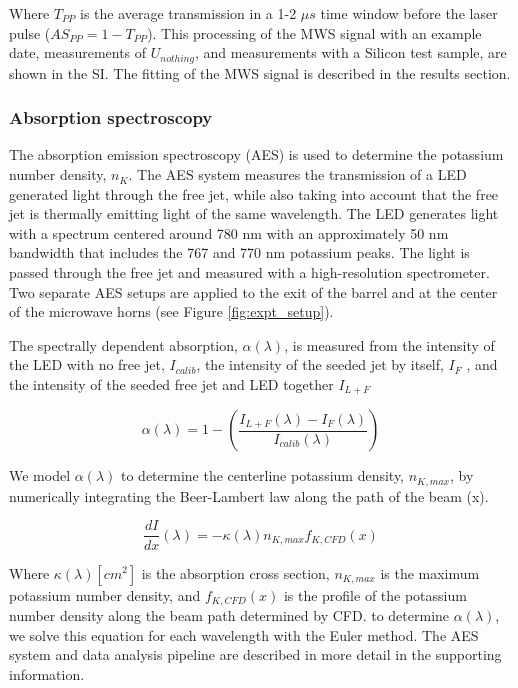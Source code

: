 Where $T_{PP}$ is the average transmission in a 1-2 $\mu s$ time window before the laser pulse ($AS_{PP} = 1 - T_{PP}$). This processing of the MWS signal with an example date, measurements of $U_{nothing}$, and measurements with a Silicon test sample, are shown in the SI. The fitting of the MWS signal is described in the results section. 


\subsubsection{Absorption spectroscopy}

The absorption emission spectroscopy (AES) is used to determine the potassium number density, $n_K$. The AES system measures the transmission of a LED generated light through the free jet, while also taking into account that the free jet is thermally emitting light of the same wavelength. The LED generates light with a spectrum centered around 780 nm with an approximately 50 nm bandwidth that includes the 767 and 770 nm potassium peaks. The light is passed through the free jet and measured with a high-resolution spectrometer. Two separate AES setups are applied to the exit of the barrel and at the center of the microwave horns (see Figure \ref{fig:expt_setup}).

The spectrally dependent absorption, $\alpha(\lambda)$, is measured from the intensity of the LED with no free jet, $I_{calib}$, the intensity of the seeded jet by itself, $I_F$ , and the intensity of the seeded free jet and LED together $I_{L+F}$

\begin{equation}
    \label{eq:absorption_def}
    \alpha(\lambda) = 1 - \left(\frac{I_{L+F}(\lambda) - I_{F}(\lambda)}{I_{calib}(\lambda)}\right)
\end{equation}


We model $\alpha(\lambda)$ to determine the centerline potassium density, $n_{K, max}$, by numerically integrating the Beer-Lambert law along the path of the beam (x).

\begin{equation}
    \frac{dI}{dx}(\lambda) = -\kappa(\lambda) n_{K,max} f_{K, CFD}(x)
\end{equation}

Where $\kappa(\lambda) [cm^2]$ is the absorption cross section, $n_{K,max}$ is the maximum potassium number density, and $f_{K, CFD}(x)$ is the profile of the potassium number density along the beam path determined by CFD. to determine $\alpha(\lambda)$, we solve this equation for each wavelength with the Euler method.  The AES system and data analysis pipeline are described in more detail in the supporting information. 

